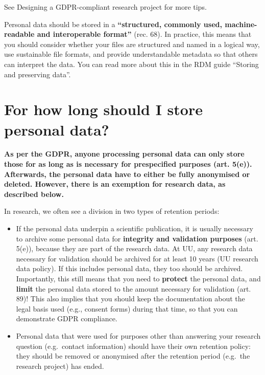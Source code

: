 \documentclass[
]{book}
\providecommand{\tightlist}{%
  \setlength{\itemsep}{0pt}\setlength{\parskip}{0pt}}
\begin{document}
See Designing a GDPR-compliant research project for more tips.

Personal data should be stored in a \textbf{``structured, commonly used, machine-readable
and interoperable format''} (rec. 68).
In practice, this means that you should consider whether your files are
structured and named in a logical way, use
sustainable file formats,
and provide understandable metadata so that others can interpret the data.
You can read more about this in the RDM guide
``Storing and preserving data''.

\hypertarget{data-storage-duration}{%
\section{For how long should I store personal data?}\label{data-storage-duration}}

\textbf{As per the GDPR, anyone processing personal data can only store those for as
long as is necessary for prespecified purposes
(art. 5(e)).
Afterwards, the personal data have to either be fully anonymised or deleted.
However, there is an exemption for research data, as described below.}

In research, we often see a division in two types of retention periods:

\begin{itemize}
\tightlist
\item
  If the personal data underpin a scientific publication, it is usually necessary
  to archive some personal data for \textbf{integrity and validation purposes}
  (art. 5(e)),
  because they are part of the research data. At UU, any research data necessary
  for validation should be archived for at least 10 years
  (UU research data policy).
  If this includes personal data, they too should be archived. Importantly, this
  still means that you need to \textbf{protect} the personal data, and \textbf{limit} the personal
  data stored to the amount necessary for validation
  (art. 89)!
  This also implies that you should keep the documentation about the legal basis
  used (e.g., consent forms) during that time, so that you can demonstrate GDPR
  compliance.
\item
  Personal data that were used for purposes other than answering your
  research question (e.g.~contact information) should have their own retention
  policy: they should be removed or anonymised after the retention period
  (e.g.~the research project) has ended.
\end{itemize}
\end{document}
